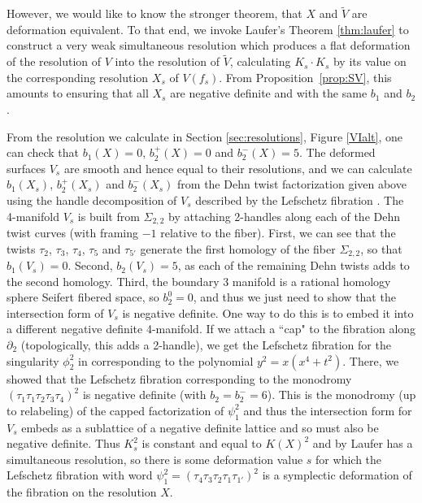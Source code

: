 \documentclass[11pt,letterpaper,reqno]{amsart}
\theoremstyle{remark}
\def \bdry {\partial}
\begin{document}
However, we would like to know the stronger theorem, that $X$ and $\tilde{V}$ are deformation equivalent. To that end, we invoke Laufer's Theorem \ref{thm:laufer} to construct a very weak simultaneous resolution which produces a flat deformation of the resolution of $V$ into the resolution of $\tilde{V}$, calculating $K_s \cdot K_s$ by its value on the corresponding resolution $X_s$ of $V(f_s)$. From Proposition~\ref{prop:SV}, this amounts to ensuring that all $X_s$ are negative definite and with the same $b_1$ and $b_2$.


From the resolution we calculate in Section \ref{sec:resolutions}, Figure \ref{VIalt}, one can check that $b_1(X) = 0$, $b_2^+(X) = 0$ and $b_2^-(X) = 5$. The deformed surfaces $V_s$ are smooth and hence equal to their resolutions, and we can calculate $b_1(X_s)$, $b_2^+(X_s)$ and $b_2^-(X_s)$ from the Dehn twist factorization given above using the handle decomposition of $V_s$ described by the Lefschetz fibration \cite{GS}. The 4-manifold $V_s$ is built from $\Sigma_{2,2}$ by attaching 2-handles along each of the Dehn twist curves (with framing $-1$ relative to the fiber). First, we can see that the twists $\tau_2$, $\tau_3$, $\tau_4$, $\tau_{5}$ and $\tau_{5'}$ generate the first homology of the fiber $\Sigma_{2,2}$, so that $b_1(V_s)=0$. Second, $b_2(V_s) = 5$, as each of the remaining Dehn twists adds to the second homology. Third, the boundary 3 manifold is a rational homology sphere Seifert fibered space, so $b_2^0 = 0$, and thus we just need to show that the intersection form of $V_s$ is negative definite. One way to do this is to embed it into a different negative definite 4-manifold. If we attach a ``cap" to the fibration along $\bdry_2$ (topologically, this adds a 2-handle), we get the Lefschetz fibration for the singularity $\phi_2^2$ in \cite{SV} corresponding to the polynomial $y^2 = x(x^4 + t^2)$. There, we showed that the Lefschetz fibration corresponding to the monodromy $(\tau_1 \tau_1 \tau_2 \tau_3 \tau_4)^2$ is negative definite (with $b_2 = b_2^- = 6$). This is the monodromy (up to relabeling) of the capped factorization of $\psi_1^2$ and thus the intersection form for $V_s$ embeds as a sublattice of a negative definite lattice and so must also be negative definite. Thus $K_s^2$ is constant and equal to $K(X)^2$ and by Laufer has a simultaneous resolution, so there is some deformation value $s$ for which the Lefschetz fibration with word $\psi_1^2 = \left(\tau_4 \tau_3 \tau_2 \tau_1 \tau_{1'}\right)^2$ is a symplectic deformation of the fibration on the resolution $X$.
\end{document}
